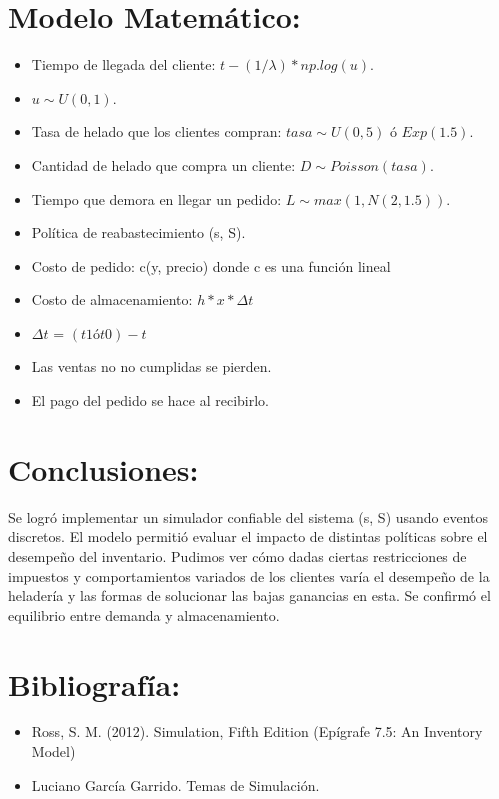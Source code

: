 \documentclass[12pt,a4paper]{article}
\begin{document}
\begin{flushleft}
\section*{Modelo Matemático:}
\begin{itemize}
\item Tiempo de llegada del cliente: $t-(1/\lambda)*np.log(u)$.
\item $u \sim U(0,1)$.
\item Tasa de helado que los clientes compran: $tasa \sim U(0, 5)$ ó $Exp(1.5)$.
\item Cantidad de helado que compra un cliente: $D \sim Poisson(tasa)$.
\item Tiempo que demora en llegar un pedido: $L \sim max(1, N(2, 1.5))$.
\item Política de reabastecimiento (s, S).
\item Costo de pedido: c(y, precio) donde c es una función lineal
\item Costo de almacenamiento: $h * x * \Delta t$
\item $\Delta t$ = $(t1 ó t0) - t$
\item Las ventas no no cumplidas se pierden.
\item El pago del pedido se hace al recibirlo.
\end{itemize}

\section*{Conclusiones:}
Se logró implementar un simulador confiable del sistema (s, S) usando eventos discretos. El modelo permitió evaluar el impacto de distintas políticas sobre el desempeño del inventario. Pudimos ver cómo dadas ciertas restricciones de impuestos y comportamientos variados de los clientes varía el desempeño de la heladería y las formas de solucionar las bajas ganancias en esta. Se confirmó el equilibrio entre demanda y almacenamiento.
\end{flushleft}

\section*{Bibliografía:}
\begin{itemize}
\item Ross, S. M. (2012). Simulation, Fifth Edition (Epígrafe 7.5: An Inventory Model)
\item Luciano García Garrido. Temas de Simulación.
\end{itemize}
\end{document}
